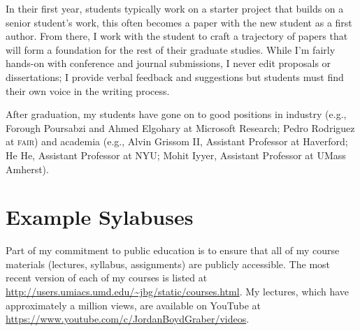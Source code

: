 \documentclass[11pt]{amsart}
\newcommand{\abr}[1]{\textsc{#1}}
\newcommand{\student}[1]{\vspace{.5cm}\fbox{\parbox{0.95\linewidth}{{\small #1}}}\vspace{.5cm}}
\begin{document}
In their first year, students typically work on a starter project that
builds on a senior student's work, this often becomes a paper with the
new student as a first author.  From there, I work with the student to
craft a trajectory of papers that will form a foundation for the rest
of their graduate studies.  While I'm fairly hands-on with conference
and journal submissions, I never edit proposals or dissertations; I
provide verbal feedback and suggestions but students must find their
own voice in the writing process.

After graduation, my students have gone on to good positions in
industry (e.g., Forough Poursabzi and Ahmed Elgohary at Microsoft
Research; Pedro Rodriguez at \abr{fair}) and academia (e.g., Alvin
Grissom II, Assistant Professor at Haverford; He He, Assistant
Professor at NYU; Mohit Iyyer, Assistant Professor at UMass Amherst).

\section{Example Sylabuses}

Part of my commitment to public education is to ensure that all of my
course materials (lectures, syllabus, assignments) are publicly
accessible. The most recent version of each of my courses is listed at
\url{http://users.umiacs.umd.edu/~jbg/static/courses.html}.  My
lectures, which have approximately a million views, are available on
YouTube at \url{https://www.youtube.com/c/JordanBoydGraber/videos}.



\end{document}

